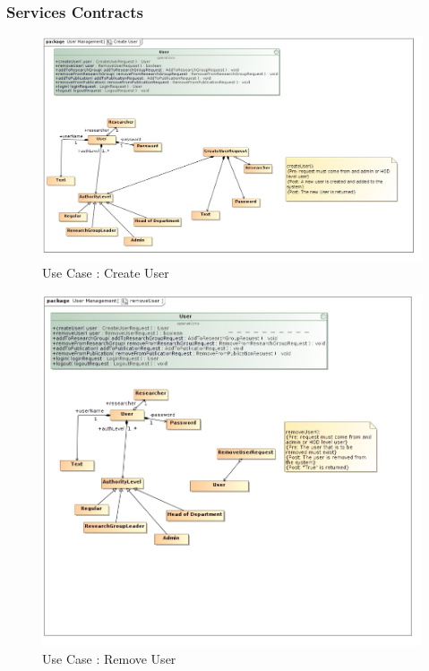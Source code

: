 \documentclass{article}
\begin{document}
	\subsubsection{Services Contracts}
		\begin{figure}[H]
			\includegraphics[scale=0.4]{ReinhardtImages/createUser.jpg}
			\caption{Use Case : Create User}
	  		\label{Use Case : Create User}
		\end{figure}
		\begin{figure}[H]
			\includegraphics[scale=0.6]{ReinhardtImages/removeUser.jpg}
			\caption{Use Case : Remove User}
	  		\label{Use Case : Remove User}
		\end{figure}
\end{document}
